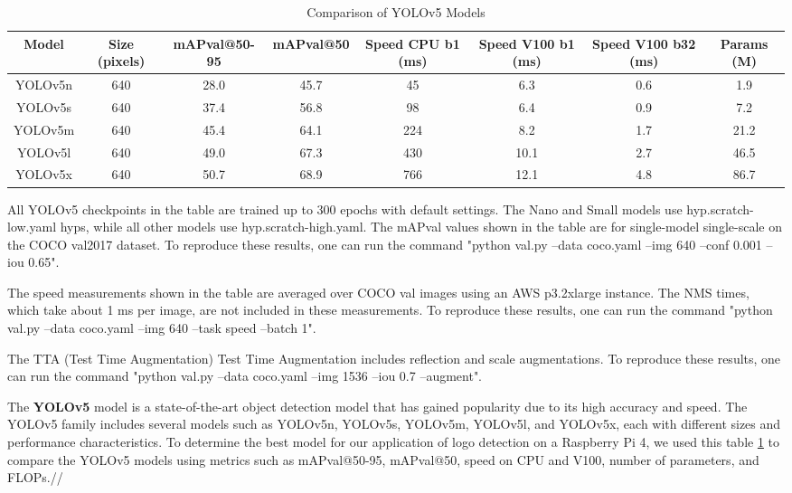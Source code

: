 \begin{table}[h!]
  \centering
  
  \begin{tabular}{|c|c|c|c|c|c|c|c|}
    \hline
    \textbf{Model} & \textbf{Size (pixels)} & \textbf{mAPval@50-95} & \textbf{mAPval@50} & \textbf{Speed CPU b1 (ms)} & \textbf{Speed V100 b1 (ms)} & \textbf{Speed V100 b32 (ms)} & \textbf{Params (M)} \\ \hline
    YOLOv5n & 640 & 28.0 & 45.7 & 45 & 6.3 & 0.6 & 1.9 \\ \hline
    YOLOv5s & 640 & 37.4 & 56.8 & 98 & 6.4 & 0.9 & 7.2 \\ \hline
    YOLOv5m & 640 & 45.4 & 64.1 & 224 & 8.2 & 1.7 & 21.2 \\ \hline
    YOLOv5l & 640 & 49.0 & 67.3 & 430 & 10.1 & 2.7 & 46.5 \\ \hline
    YOLOv5x & 640 & 50.7 & 68.9 & 766 & 12.1 & 4.8 & 86.7 \\ \hline
  \end{tabular}
\caption{Comparison of YOLOv5 Models \cite{U23}}
  \label{tab:yolov5_comparison}
\vspace{0.5cm}

\footnotesize All YOLOv5 checkpoints in the table are trained up to 300 epochs with default settings. The Nano and Small models use hyp.scratch-low.yaml hyps, while all other models use hyp.scratch-high.yaml. The mAPval values shown in the table are for single-model single-scale on the COCO val2017 dataset. To reproduce these results, one can run the command "python val.py --data coco.yaml --img 640 --conf 0.001 --iou 0.65".\cite{U23}

The speed measurements shown in the table are averaged over COCO val images using an AWS p3.2xlarge instance. The NMS times, which take about 1 ms per image, are not included in these measurements. To reproduce these results, one can run the command "python val.py --data coco.yaml --img 640 --task speed --batch 1".\cite{U23}

The TTA (Test Time Augmentation) Test Time Augmentation includes reflection and scale augmentations. To reproduce these results, one can run the command "python val.py --data coco.yaml --img 1536 --iou 0.7 --augment".\cite{U23}
\end{table}
\FloatBarrier

The \textbf{YOLOv5} model is a state-of-the-art object detection model that has gained popularity due to its high accuracy and speed. The YOLOv5 family includes several models such as YOLOv5n, YOLOv5s, YOLOv5m, YOLOv5l, and YOLOv5x, each with different sizes and performance characteristics. To determine the best model for our application of logo detection on a Raspberry Pi 4, we used this table \ref{tab:yolov5_comparison} to compare the YOLOv5 models using metrics such as mAPval@50-95, mAPval@50, speed on CPU and V100, number of parameters, and FLOPs.//

